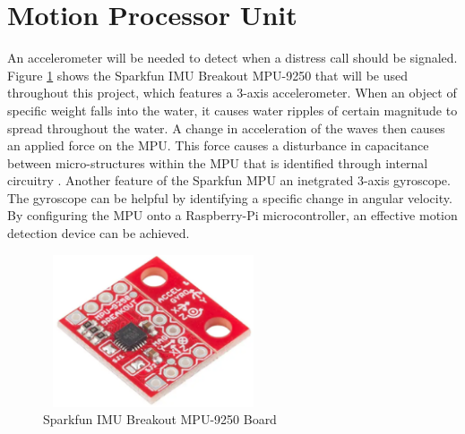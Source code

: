 \section{Motion Processor Unit}
An accelerometer will be needed to detect when a distress call should be signaled. Figure \ref{accel} shows the Sparkfun IMU Breakout MPU-9250 that will be used throughout this project, which features a 3-axis accelerometer. When an object of specific weight falls into the water, it causes water ripples of certain magnitude to spread throughout the water. A change in acceleration of the waves then causes an applied force on the MPU. This force causes a disturbance in capacitance between micro-structures within the MPU that is identified through internal circuitry \cite{acceler}. Another feature of the Sparkfun MPU an inetgrated 3-axis gyroscope. The gyroscope can be helpful by identifying a specific change in angular velocity. By configuring the MPU onto a Raspberry-Pi microcontroller, an effective motion detection device can be achieved. \hfill
\newline

\begin{figure}[H]
\centering
\includegraphics[width = 6.5cm,height = 4.5cm]{graphics/Accelerometer.PNG}

\caption{Sparkfun IMU Breakout MPU-9250 Board}
\label{accel}
 
\end{figure}